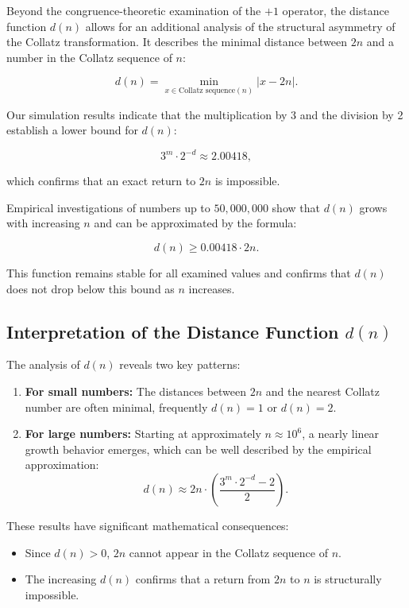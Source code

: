\documentclass[a4paper,12pt]{article}
\begin{document}
Beyond the congruence-theoretic examination of the \( +1 \) operator, the distance function \( d(n) \) allows for an additional analysis of the structural asymmetry of the Collatz transformation. It describes the minimal distance between \( 2n \) and a number in the Collatz sequence of \( n \):

\begin{equation}
    d(n) = \min_{x \in \text{Collatz sequence}(n)} |x - 2n|.
\end{equation}

Our simulation results indicate that the multiplication by 3 and the division by 2 establish a lower bound for \( d(n) \):

\begin{equation}
    3^m \cdot 2^{-d} \approx 2.00418,
\end{equation}

which confirms that an exact return to \( 2n \) is impossible.

Empirical investigations of numbers up to \( 50,000,000 \) show that \( d(n) \) grows with increasing \( n \) and can be approximated by the formula:

\begin{equation}
    d(n) \geq 0.00418 \cdot 2n.
\end{equation}

This function remains stable for all examined values and confirms that \( d(n) \) does not drop below this bound as \( n \) increases.

\subsection{Interpretation of the Distance Function \( d(n) \)}

The analysis of \( d(n) \) reveals two key patterns:

\begin{enumerate}
    \item \textbf{For small numbers:} The distances between \( 2n \) and the nearest Collatz number are often minimal, frequently \( d(n) = 1 \) or \( d(n) = 2 \).
    \item \textbf{For large numbers:} Starting at approximately \( n \approx 10^6 \), a nearly linear growth behavior emerges, which can be well described by the empirical approximation:
    \[
    d(n) \approx 2n \cdot \left( \frac{3^m \cdot 2^{-d} - 2}{2} \right).
    \]
\end{enumerate}

These results have significant mathematical consequences:
\begin{itemize}
    \item Since \( d(n) > 0 \), \( 2n \) cannot appear in the Collatz sequence of \( n \).
    \item The increasing \( d(n) \) confirms that a return from \( 2n \) to \( n \) is structurally impossible.
\end{itemize}
\end{document}
